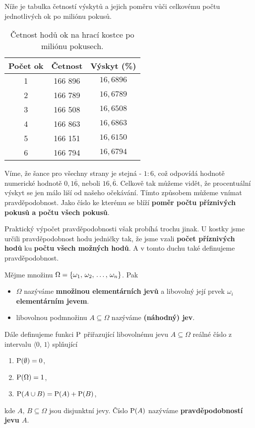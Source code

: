 Níže je tabulka četností výskytů a jejich poměru vůči celkovému počtu jednotlivých ok po miliónu pokusů.
\begin{table}[H]
    \centering
    \begin{tabular}{|c|c|c|}
    \hline
    Počet ok & Četnost & Výskyt (\%)     \\ \hline
    1     & 166 896 & $16{,}6896$ \\
    2     & 166 789 & $16{,}6789$ \\
    3     & 166 508 & $16{,}6508$ \\
    4     & 166 863 & $16{,}6863$ \\
    5     & 166 151 & $16{,}6150$ \\
    6     & 166 794 & $16{,}6794$ \\ \hline
    \end{tabular}
    \caption {Četnost hodů ok na hrací kostce po miliónu pokusech.}
\end{table}
Víme, že šance pro všechny strany je stejná - $1:6$, což odpovídá hodnotě numerické hodnotě $0{,}1\overline{6}$, neboli $16{,}\overline{6}$. Celkově tak můžeme vidět, že procentuální výskyt se jen málo liší od našeho očekávání. Tímto způsobem můžeme vnímat pravděpodobnost. Jako číslo ke kterému se blíží \textbf{poměr počtu příznivých pokusů a počtu všech pokusů}.\par
Praktický výpočet pravděpodobnosti však probíhá trochu jinak. U kostky jsme určili pravděpodobnost hodu jedničky tak, že jsme vzali \textbf{počet příznivých hodů} ku \textbf{počtu všech možných hodů}. A v tomto duchu také definujeme pravděpodobnost.\par
\begin{definition}\label{def:elementarni_nahodny_jev_pravdepodobnost}
    Mějme množinu $\Omega=\left\{\omega_1,\,\omega_2,\,\dots,\,\omega_n\right\}$. Pak
    \begin{itemize}
        \item $\Omega$ nazýváme \textbf{množinou elementárních jevů} a libovolný její prvek $\omega_i$ \textbf{elementárním jevem}.
        \item libovolnou podmnožinu $A\subseteq\Omega$ nazýváme \textbf{(náhodný) jev}.
    \end{itemize}
    Dále definujeme funkci $\operatorname{\text{P}}$ přiřazující libovolnému jevu $A\subseteq\Omega$ reálné číslo z intervalu $\langle0,\,1\rangle$ splňující
    \begin{enumerate}[label=(\roman*)]
        \item $\operatorname{\text{P}}(\emptyset)=0$,
        \item $\operatorname{\text{P}}(\Omega)=1$,
        \item $\operatorname{\text{P}}(A\cup B)=\operatorname{\text{P}}(A)+\operatorname{\text{P}}(B)$,
    \end{enumerate}
    kde $A,\,B\subseteq\Omega$ jsou disjunktní jevy. Číslo $\operatorname{\text{P}}(A)$ nazýváme \textbf{pravděpodobností jevu $A$}.
\end{definition}
